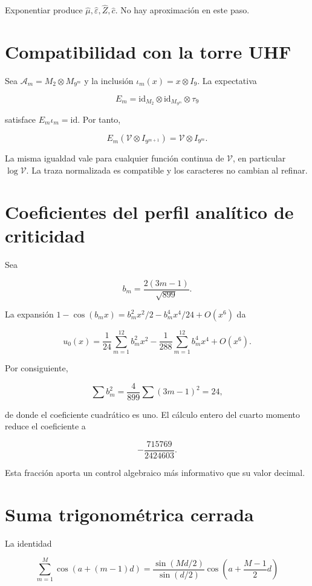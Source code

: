 Exponentiar produce \(\widehat\mu,\widehat\varepsilon,\widehat Z,\widehat c\). No hay aproximaci\'on en este paso.

\section{Compatibilidad con la torre UHF}

Sea \(\mathcal A_m=M_2\otimes M_{9^m}\) y la inclusi\'on \(\iota_m(x)=x\otimes I_9\). La expectativa

\[
E_m=\mathrm{id}_{M_2}\otimes\mathrm{id}_{M_{9^m}}\otimes\tau_9
\]

satisface \(E_m\iota_m=\mathrm{id}\). Por tanto,

\[
E_m(\mathcal V\otimes I_{9^{m+1}})
=\mathcal V\otimes I_{9^m}.
\]

La misma igualdad vale para cualquier funci\'on continua de \(\mathcal V\), en particular \(\log\mathcal V\). La traza normalizada es compatible y los caracteres no cambian al refinar.

\section{Coeficientes del perfil anal\'itico de criticidad}

Sea

\[
b_m=\frac{2(3m-1)}{\sqrt{899}}.
\]

La expansi\'on \(1-\cos(b_mx)=b_m^2x^2/2-b_m^4x^4/24+O(x^6)\) da

\[
u_0(x)=\frac1{24}\sum_{m=1}^{12}b_m^2x^2
-\frac1{288}\sum_{m=1}^{12}b_m^4x^4+O(x^6).
\]

Por consiguiente,

\[
\sum b_m^2=\frac4{899}\sum(3m-1)^2=24,
\]

de donde el coeficiente cuadr\'atico es uno. El c\'alculo entero del cuarto momento reduce el coeficiente a

\[
-\frac{715769}{2424603}.
\]

Esta fracci\'on aporta un control algebraico m\'as informativo que su valor
decimal.

\section{Suma trigonom\'etrica cerrada}

La identidad

\[
\sum_{m=1}^{M}\cos(a+(m-1)d)
=\frac{\sin(Md/2)}{\sin(d/2)}
\cos\!\left(a+\frac{M-1}{2}d\right)
\]

